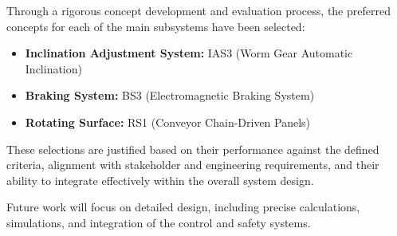 Through a rigorous concept development and evaluation process, the preferred concepts for each of the main subsystems have been selected:

\begin{itemize}
    \item \textbf{Inclination Adjustment System:} IAS3 (Worm Gear Automatic Inclination)
    \item \textbf{Braking System:} BS3 (Electromagnetic Braking System)
    \item \textbf{Rotating Surface:} RS1 (Conveyor Chain-Driven Panels)
\end{itemize}

These selections are justified based on their performance against the defined criteria, alignment with stakeholder and engineering requirements, and their ability to integrate effectively within the overall system design.

Future work will focus on detailed design, including precise calculations, simulations, and integration of the control and safety systems.
